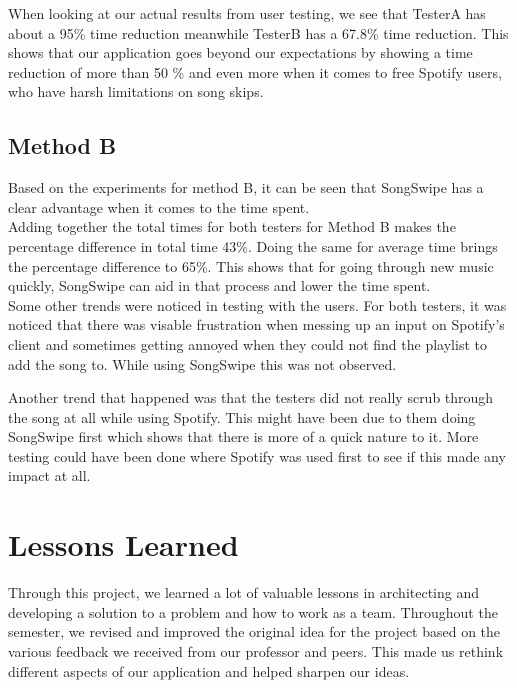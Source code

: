 \documentclass{article}
\begin{document}
When looking at our actual results from user testing, we see that TesterA has about a 95\% time reduction meanwhile TesterB has a 67.8\% time reduction. This shows that our application goes beyond our expectations by showing a time reduction of more than 50 \% and even more when it comes to free Spotify users, who have harsh limitations on song skips. \\

\subsection*{Method B}
Based on the experiments for method B, it can be seen that SongSwipe has a clear advantage when it comes to the time spent. \\

Adding together the total times for both testers for Method B makes the percentage difference in total time 43\%. Doing the same for average time brings the percentage difference to 65\%. This shows that for going through new music quickly, SongSwipe can aid in that process and lower the time spent. \\

Some other trends were noticed in testing with the users. For both testers, it was noticed that there was visable frustration when messing up an input on Spotify's client and sometimes getting annoyed when they could not find the playlist to add the song to. While using SongSwipe this was not observed.

Another trend that happened was that the testers did not really scrub through the song at all while using Spotify. This might have been due to them doing SongSwipe first which shows that there is more of a quick nature to it. More testing could have been done where Spotify was used first to see if this made any impact at all.


\section{Lessons Learned}

Through this project, we learned a lot of valuable lessons in architecting and developing a solution to a problem and how to work as a team. Throughout the semester, we revised and improved the original idea for the project based on the various feedback we received from our professor and peers. This made us rethink different aspects of our application and helped sharpen our ideas. \\
\end{document}
